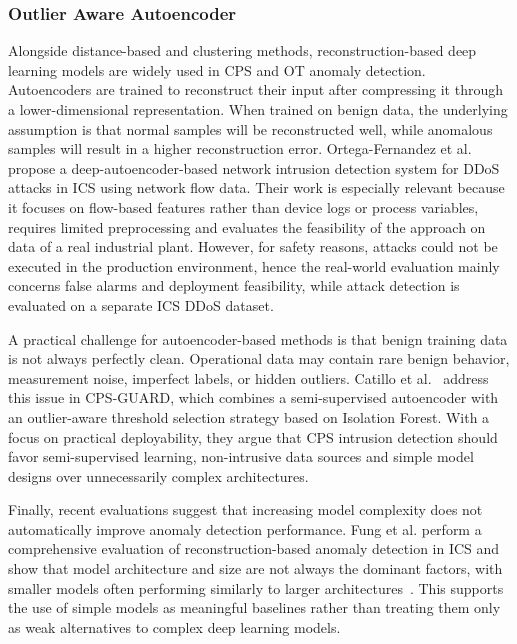 \subsubsection{Outlier Aware Autoencoder}
Alongside distance-based and clustering methods, reconstruction-based deep learning models are widely used in CPS and OT anomaly detection. Autoencoders are trained to reconstruct their input after compressing it through a lower-dimensional representation. When trained on benign data, the underlying assumption is that normal samples will be reconstructed well, while anomalous samples will result in a higher reconstruction error. Ortega-Fernandez et al.~\cite{ortega-fernandez_network_2024} propose a deep-autoencoder-based network intrusion detection system for DDoS attacks in ICS using network flow data. Their work is especially relevant because it focuses on flow-based features rather than device logs or process variables, requires limited preprocessing and evaluates the feasibility of the approach on data of a real industrial plant. However, for safety reasons, attacks could not be executed in the production environment, hence the real-world evaluation mainly concerns false alarms and deployment feasibility, while attack detection is evaluated on a separate ICS DDoS dataset. 

A practical challenge for autoencoder-based methods is that benign training data is not always perfectly clean. Operational data may contain rare benign behavior, measurement noise, imperfect labels, or hidden outliers. Catillo et al.~\cite{catillo_cps-guard_2023} address this issue in CPS-GUARD, which combines a semi-supervised autoencoder with an outlier-aware threshold selection strategy based on Isolation Forest. With a focus on practical deployability, they argue that CPS intrusion detection should favor semi-supervised learning, non-intrusive data sources and simple model designs over unnecessarily complex architectures.

Finally, recent evaluations suggest that increasing model complexity does not automatically improve anomaly detection performance. Fung et al. perform a comprehensive evaluation of reconstruction-based anomaly detection in ICS and show that model architecture and size are not always the dominant factors, with smaller models often performing similarly to larger architectures~\cite{fung_perspectives_2022}. This supports the use of simple models as meaningful baselines rather than treating them only as weak alternatives to complex deep learning models.


